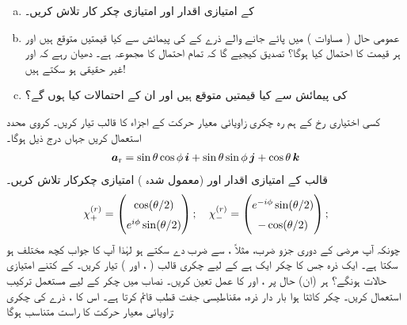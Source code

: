  \begin{enumerate}[a.]
\item
  کے امتیازی اقدار اور امتیازی چکر کار تلاش کریں۔
\item
 عمومی حال ( مساوات ) میں پائے جانے والے ذرے کے  کی پیمائش سے کیا قیمتیں متوقع ہیں اور ہر قیمت کا احتمال کیا ہوگا؟ تصدیق کیجیے گا کہ تمام احتمال کا مجموعہ  ہے۔ دھیان رہے کہ  اور  غیر حقیقی ہو سکتے ہیں! 
\item
  کی پیمائش سے کیا قیمتیں متوقع ہیں اور ان کے احتمالات کیا ہوں گے؟ 
\end{enumerate}
کسی اختیاری رخ  کے ہم رہ چکری زاویائی معیار حرکت کے اجزاء کا قالب  تیار کریں۔ کروی محدد استعمال کریں جہاں درج ذیل ہوگا۔
\begin{align}
{\boldsymbol{a}}_{\textup{r}}= \sin\theta \cos\phi\, {\boldsymbol{i}} + \sin\theta \sin\phi \, {\boldsymbol{j}} + \cos\theta \, {\boldsymbol{k}}
\end{align}
 قالب  کے امتیازی اقدار اور (معمول شدہ ) امتیازی چکرکار تلاش کریں۔ 
\begin{align}
\renewcommand{\arraystretch}{1.5}
\chi_{+}^{(r)} = \begin{pmatrix} \cos(\theta/2)\\ e^{i\phi}\sin(\theta/2)\end{pmatrix};
\quad
\chi_{-}^{(r)} = \begin{pmatrix} e^{-i\phi}\sin(\theta/2)\\ -\cos(\theta/2)\end{pmatrix};
\end{align}
چونکہ آپ مرضی کے دوری جزو ضرب، مثلاً ، سے ضرب دے سکتے ہو لہٰذا آپ کا جواب کچھ مختلف ہو سکتا ہے۔ 
ایک ذرہ جس کا چکر ایک  ہے کے لیے چکری قالب ( ،  اور ) تیار کریں۔  
کے کتنے امتیازی حالات ہونگے؟ ہر (ان) حال پر ،  اور  کا عمل تعین کریں۔ نصاب میں  چکر کے لیے مستعمل ترکیب استعمال کریں۔
 چکر کاٹتا ہوا بار دار ذرہ، مقناطیسی جفت قطب قائم کرتا ہے۔ اس کا  ، ذرے کی چکری زاویائی معیار حرکت  کا راست متناسب ہوگا:
